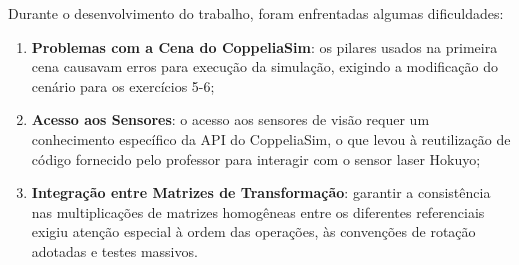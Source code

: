 Durante o desenvolvimento do trabalho, foram enfrentadas algumas dificuldades:

\begin{enumerate}
    \item \textbf{Problemas com a Cena do CoppeliaSim}: os pilares usados na primeira cena causavam erros para execução da simulação, exigindo a modificação do cenário para os exercícios 5-6;

    \item \textbf{Acesso aos Sensores}: o acesso aos sensores de visão requer um conhecimento específico da API do CoppeliaSim, o que levou à reutilização de código fornecido pelo professor para interagir com o sensor laser Hokuyo;

    \item \textbf{Integração entre Matrizes de Transformação}: garantir a consistência nas multiplicações de matrizes homogêneas entre os diferentes referenciais exigiu atenção especial à ordem das operações, às convenções de rotação adotadas e testes massivos.
\end{enumerate}

